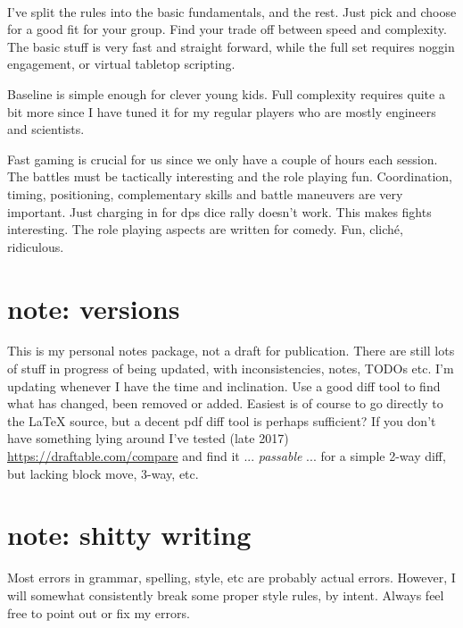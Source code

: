 \documentclass[11pt, twoside, titlepage, a4paper]{report}
\newcommand{\vvsmall}{\scriptsize}   %
\begin{document}

\

I've split the rules into the basic fundamentals, and the rest. Just pick and choose for a good fit for your group. Find your trade off between speed and complexity. The basic stuff is very fast and straight forward, while the full set requires noggin engagement, or virtual tabletop scripting.

Baseline is simple enough for clever young kids. Full complexity requires quite a bit more since I have tuned it for my regular players who are mostly engineers and scientists.

Fast gaming is crucial for us since we only have a couple of hours each session. The battles must be tactically interesting and the role playing fun. Coordination, timing, positioning, complementary skills and battle maneuvers are very important. Just charging in for dps dice rally doesn't work. This makes fights interesting. The role playing aspects are written for comedy. Fun, cliché, ridiculous.



\clearpage
\thispagestyle{empty}
\section*{note: versions}
This is my personal notes package, not a draft for publication. There are still lots of stuff in progress of being updated, with inconsistencies, notes, TODOs etc.
I'm updating whenever I have the time and inclination. Use a good diff tool to find what has changed, been removed or added. Easiest is of course to go directly to the \LaTeX{} source, but a decent pdf diff tool is perhaps sufficient? If you don't have something lying around I've tested 
\vvsmall(late 2017)\normalsize~
\url{https://draftable.com/compare} 
and find it ... \emph{passable} ... for a simple 2-way diff, but lacking block move, 3-way, etc.


\section*{note: shitty writing}
Most errors in grammar, spelling, style, etc are probably actual errors. However, I will somewhat consistently break some proper style rules, by intent. Always feel free to point out or fix my errors.
\end{document}
